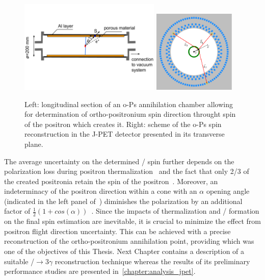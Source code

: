 \begin{figure}[h!]
  \centering
  \includegraphics[width=0.6\textwidth]{Chapter5_test_jpet/img/chamber}
  \hspace{1em}
  \includegraphics[width=0.35\textwidth]{Chapter5_test_jpet/img/pet-ops}
  \caption{Left: longitudinal section of an o-Ps annihilation chamber allowing for determination of ortho-positronium spin direction throught spin of the positron which creates it. Right: scheme of the o-Ps spin reconstruction in the J-PET detector presented in its transverse plane.}
  \label{fig:ops_spin_determination}
\end{figure}

The average uncertainty on the determined \ops/ spin further depends on the polarization loss during positron thermalization~\cite{PhysRevLett.43.1281} and the fact that only 2/3 of the created positronia retain the spin of the positron~\cite{Arbic:1988pv}. Moreover, an indeterminacy of the positron direction within a cone with an $\alpha$ opening angle (indicated in the left panel of~) diminishes the polarization by an additional factor of $\frac{1}{2}(1+cos(\alpha))$~\cite{Coleman}. Since the impacts of thermalization and \ops/ formation on the final spin estimation are inevitable, it is crucial to minimize the effect from positron flight direction uncertainty. This can be achieved with a precise reconstruction of the ortho-positronium annihilation point, providing which was one of the objectives of this Thesis. Next Chapter contains a description of a suitable \ops/$\to 3\gamma$ reconstruction technique whereas the results of its preliminary performance studies are presented in~\cref{chapter:analysis_jpet}.





 	

